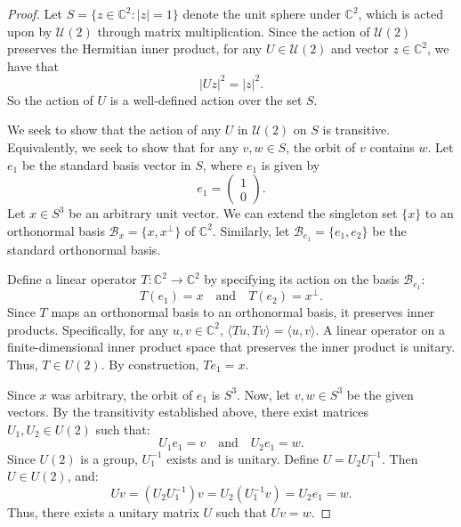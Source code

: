 \begin{proof}
Let $S = \{z \in \mathbb{C}^2 : |z| = 1\}$ denote the unit sphere under $\mathbb{C}^2$, which is acted upon by $\mathcal{U}(2)$ through matrix multiplication.
Since the action of $\mathcal{U}(2)$ preserves the Hermitian inner product, for any $U \in \mathcal{U}(2)$ and vector $z \in \mathbb{C}^2$, we have that
\begin{equation}
    |Uz|^2 = |z|^2.
\end{equation}
So the action of $U$ is a well-defined action over the set $S$.

We seek to show that the action of any $U$ in $\mathcal{U}(2)$ on $S$ is transitive.
Equivalently, we seek to show that for any $v, w \in S$, the orbit of $v$ contains $w$.
Let $e_1$ be the standard basis vector in $S$, where $e_1$ is given by
\begin{equation}
    e_1 = \begin{pmatrix} 1 \\ 0 \end{pmatrix}.
\end{equation}
Let $x \in S^3$ be an arbitrary unit vector. We can extend the singleton set $\{x\}$ to an orthonormal basis $\mathcal{B}_x = \{x, x^\perp\}$ of $\mathbb{C}^2$. Similarly, let $\mathcal{B}_{e_1} = \{e_1, e_2\}$ be the standard orthonormal basis.

Define a linear operator $T: \mathbb{C}^2 \to \mathbb{C}^2$ by specifying its action on the basis $\mathcal{B}_{e_1}$:
\begin{equation}
T(e_1) = x \quad \text{and} \quad T(e_2) = x^\perp.
\end{equation}
Since $T$ maps an orthonormal basis to an orthonormal basis, it preserves inner products. Specifically, for any $u, v \in \mathbb{C}^2$, $\langle Tu, Tv \rangle = \langle u, v \rangle$. A linear operator on a finite-dimensional inner product space that preserves the inner product is unitary. Thus, $T \in U(2)$. By construction, $T e_1 = x$.

Since $x$ was arbitrary, the orbit of $e_1$ is $S^3$. Now, let $v, w \in S^3$ be the given vectors. By the transitivity established above, there exist matrices $U_1, U_2 \in U(2)$ such that:
\begin{equation}
    U_1 e_1 = v \quad \text{and} \quad U_2 e_1 = w.
\end{equation}
Since $U(2)$ is a group, $U_1^{-1}$ exists and is unitary. Define $U = U_2 U_1^{-1}$. Then $U \in U(2)$, and:
\begin{equation}
U v = (U_2 U_1^{-1}) v = U_2 (U_1^{-1} v) = U_2 e_1 = w.
\end{equation}
Thus, there exists a unitary matrix $U$ such that $Uv = w$.
\end{proof}

